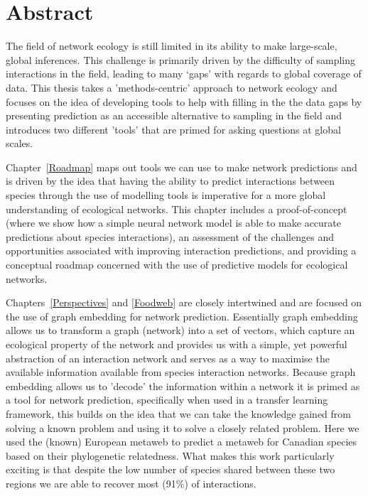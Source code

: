 \documentclass[12pt,twoside,phd]{dms}
\numberwithin{equation}{section}
\numberwithin{table}{chapter}
\numberwithin{figure}{chapter}
\begin{document}

\anglais
\chapter*{Abstract}

The field of network ecology is still limited in its ability to make large-scale, global inferences. This challenge is primarily driven by the difficulty of sampling interactions in the field, leading to many ‘gaps’ with regards to global coverage of data. This thesis takes a 'methods-centric' approach to network ecology and focuses on the idea of developing tools to help with filling in the the data gaps by presenting prediction as an accessible alternative to sampling in the field and introduces two different 'tools' that are primed for asking questions at global scales.

Chapter~\ref{Roadmap} maps out tools we can use to make network predictions and is driven by the idea that having the ability to predict interactions between species through the use of modelling tools is imperative for a more global understanding of ecological networks. This chapter includes a proof-of-concept (where we show how a simple neural network model is able to make accurate predictions about species interactions), an assessment of the challenges and opportunities associated with improving interaction predictions, and providing a conceptual roadmap concerned with the use of predictive models for ecological networks.

Chapters~\ref{Perspectives} and \ref{Foodweb} are closely intertwined and are focused on the use of graph embedding for network prediction. Essentially graph embedding allows us to transform a graph (network) into a set of vectors, which capture an ecological property of the network and provides us with a simple, yet powerful abstraction of an interaction network and serves as a way to maximise the available information available from species interaction networks. Because graph embedding allows us to 'decode' the information within a network it is primed as a tool for network prediction, specifically when used in a transfer learning framework, this builds on the idea that we can take the knowledge gained from solving a known problem and using it to solve a closely related problem. Here we used the (known) European metaweb to predict a metaweb for Canadian species based on their phylogenetic relatedness. What makes this work particularly exciting is that despite the low number of species shared between these two regions we are able to recover most (91\%) of interactions. 
\end{document}
